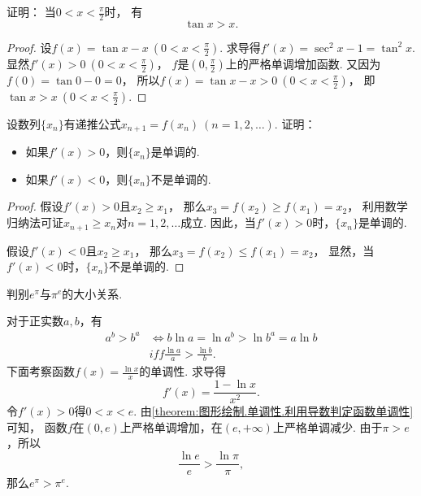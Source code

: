 \begin{example}
证明：
当\(0<x<\frac\pi2\)时，
有\begin{equation}\label{equation:单调性.正切不等式}
	\tan x > x.
\end{equation}
\begin{proof}
设\(f(x) = \tan x - x\ (0<x<\frac\pi2)\).
求导得\(f'(x) = \sec^2 x - 1 = \tan^2 x\).
显然\(f'(x) > 0\ (0<x<\frac\pi2)\)，
\(f\)是\((0,\frac\pi2)\)上的严格单调增加函数.
又因为\(f(0) = \tan0 - 0 = 0\)，
所以\(f(x) = \tan x - x > 0\ (0<x<\frac\pi2)\)，
即\(\tan x > x\ (0<x<\frac\pi2)\).
\end{proof}
\end{example}

\begin{example}
设数列\(\{x_n\}\)有递推公式\(x_{n+1} = f(x_n)\ (n=1,2,\dotsc)\).
证明：\begin{itemize}
	\item 如果\(f'(x) > 0\)，则\(\{x_n\}\)是单调的.
	\item 如果\(f'(x) < 0\)，则\(\{x_n\}\)不是单调的.
\end{itemize}
\begin{proof}
假设\(f'(x) > 0\)且\(x_2 \geq x_1\)，
那么\(x_3 = f(x_2) \geq f(x_1) = x_2\)，
利用数学归纳法可证\(x_{n+1} \geq x_n\)对\(n=1,2,\dotsc\)成立.
因此，当\(f'(x) > 0\)时，\(\{x_n\}\)是单调的.

假设\(f'(x) < 0\)且\(x_2 \geq x_1\)，
那么\(x_3 = f(x_2) \leq f(x_1) = x_2\)，
显然，当\(f'(x) < 0\)时，\(\{x_n\}\)不是单调的.
\end{proof}
\end{example}

\begin{example}
判别\(e^\pi\)与\(\pi^e\)的大小关系.
\begin{solution}
对于正实数\(a,b\)，有\begin{align*}
	a^b > b^a
	&\iff
	b \ln a = \ln a^b > \ln b^a = a \ln b \\
	&iff
	\frac{\ln a}{a} > \frac{\ln b}{b}.
\end{align*}
下面考察函数\(f(x) = \frac{\ln x}{x}\)的单调性.
求导得\[
	f'(x) = \frac{1 - \ln x}{x^2}.
\]
令\(f'(x) > 0\)得\(0 < x < e\).
由\cref{theorem:图形绘制.单调性.利用导数判定函数单调性} 可知，
函数\(f\)在\((0,e)\)上严格单调增加，在\((e,+\infty)\)上严格单调减少.
由于\(\pi > e\)，所以\[
	\frac{\ln e}{e} > \frac{\ln \pi}{\pi},
\]
那么\(e^\pi > \pi^e\).
\end{solution}
\end{example}

